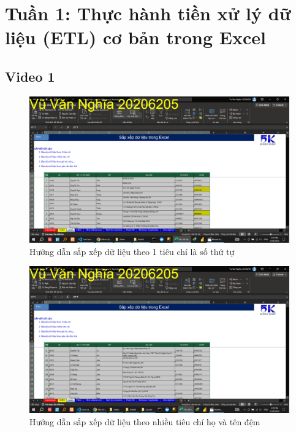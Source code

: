 \documentclass{article}
\begin{document}
\tableofcontents
\newpage
\listoffigures
\newpage
\section{Tuần 1: Thực hành tiền xử lý dữ liệu (ETL) cơ bản trong Excel}
\subsection{Video 1}
\begin{figure}[H]
\centering
\includegraphics[scale = 0.15]{Video1/HuongDan/1.png}
\caption{Hướng dẫn sắp xếp dữ liệu theo 1 tiêu chí là số thứ tự}
\end{figure}

\begin{figure}[H]
\centering
\includegraphics[scale = 0.15]{Video1/HuongDan/2.png}
\caption{Hướng dẫn sắp xếp dữ liệu theo nhiều tiêu chí họ và tên đệm}
\end{figure}
\end{document}
